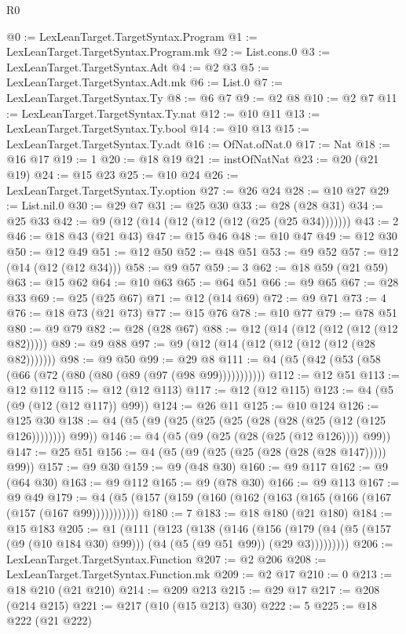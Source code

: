\begin{lexlean}{R0}
\begin{coremodule}
@0 := LexLeanTarget.TargetSyntax.Program
@1 := LexLeanTarget.TargetSyntax.Program.mk
@2 := List.cons.{0}
@3 := LexLeanTarget.TargetSyntax.Adt
@4 := @2 @3
@5 := LexLeanTarget.TargetSyntax.Adt.mk
@6 := List.{0}
@7 := LexLeanTarget.TargetSyntax.Ty
@8 := @6 @7
@9 := @2 @8
@10 := @2 @7
@11 := LexLeanTarget.TargetSyntax.Ty.nat
@12 := @10 @11
@13 := LexLeanTarget.TargetSyntax.Ty.bool
@14 := @10 @13
@15 := LexLeanTarget.TargetSyntax.Ty.adt
@16 := OfNat.ofNat.{0}
@17 := Nat
@18 := @16 @17
@19 := 1
@20 := @18 @19
@21 := instOfNatNat
@23 := @20 (@21 @19)
@24 := @15 @23
@25 := @10 @24
@26 := LexLeanTarget.TargetSyntax.Ty.option
@27 := @26 @24
@28 := @10 @27
@29 := List.nil.{0}
@30 := @29 @7
@31 := @25 @30
@33 := @28 (@28 @31)
@34 := @25 @33
@42 := @9 (@12 (@14 (@12 (@12 (@12 (@25 (@25 @34)))))))
@43 := 2
@46 := @18 @43 (@21 @43)
@47 := @15 @46
@48 := @10 @47
@49 := @12 @30
@50 := @12 @49
@51 := @12 @50
@52 := @48 @51
@53 := @9 @52
@57 := @12 (@14 (@12 (@12 @34)))
@58 := @9 @57
@59 := 3
@62 := @18 @59 (@21 @59)
@63 := @15 @62
@64 := @10 @63
@65 := @64 @51
@66 := @9 @65
@67 := @28 @33
@69 := @25 (@25 @67)
@71 := @12 (@14 @69)
@72 := @9 @71
@73 := 4
@76 := @18 @73 (@21 @73)
@77 := @15 @76
@78 := @10 @77
@79 := @78 @51
@80 := @9 @79
@82 := @28 (@28 @67)
@88 := @12 (@14 (@12 (@12 (@12 (@12 @82)))))
@89 := @9 @88
@97 := @9 (@12 (@14 (@12 (@12 (@12 (@12 (@28 @82)))))))
@98 := @9 @50
@99 := @29 @8
@111 := @4 (@5 (@42 (@53 (@58 (@66 (@72 (@80 (@80 (@89 (@97 (@98 @99)))))))))))
@112 := @12 @51
@113 := @12 @112
@115 := @12 (@12 @113)
@117 := @12 (@12 @115)
@123 := @4 (@5 (@9 (@12 (@12 @117)) @99))
@124 := @26 @11
@125 := @10 @124
@126 := @125 @30
@138 := @4 (@5 (@9 (@25 (@25 (@25 (@28 (@28 (@25 (@12 (@125 @126)))))))) @99))
@146 := @4 (@5 (@9 (@25 (@28 (@25 (@12 @126)))) @99))
@147 := @25 @51
@156 := @4 (@5 (@9 (@25 (@25 (@28 (@28 (@28 @147))))) @99))
@157 := @9 @30
@159 := @9 (@48 @30)
@160 := @9 @117
@162 := @9 (@64 @30)
@163 := @9 @112
@165 := @9 (@78 @30)
@166 := @9 @113
@167 := @9 @49
@179 := @4 (@5 (@157 (@159 (@160 (@162 (@163 (@165 (@166 (@167 (@157 (@167 @99)))))))))))
@180 := 7
@183 := @18 @180 (@21 @180)
@184 := @15 @183
@205 := @1
    (@111
      (@123
        (@138
          (@146
            (@156
              (@179 (@4 (@5 (@157 (@9 (@10 @184 @30) @99))) (@4 (@5 (@9 @51 @99)) (@29 @3)))))))))
@206 := LexLeanTarget.TargetSyntax.Function
@207 := @2 @206
@208 := LexLeanTarget.TargetSyntax.Function.mk
@209 := @2 @17
@210 := 0
@213 := @18 @210 (@21 @210)
@214 := @209 @213
@215 := @29 @17
@217 := @208 (@214 @215)
@221 := @217 (@10 (@15 @213) @30)
@222 := 5
@225 := @18 @222 (@21 @222)

\end{coremodule}
\end{lexlean}
